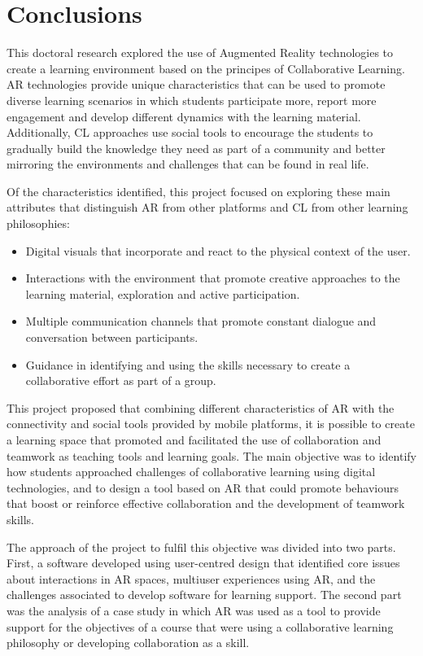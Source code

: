 \chapter{Conclusions \label{ch7}}

This doctoral research explored the use of Augmented Reality technologies to create a learning environment based on the principes of Collaborative Learning. \acf{AR}
technologies provide unique characteristics that can be used to promote diverse learning scenarios in which students participate more, report more engagement and develop
different dynamics with the learning material. Additionally, \acf{CL} approaches use social tools to encourage the students to gradually build the knowledge they need as
part of a community and better mirroring the environments and challenges that can be found in real life.

Of the characteristics identified, this project focused on exploring these main attributes that distinguish \ac{AR} from other platforms and \ac{CL} from other learning
philosophies:

\begin{itemize}
    \item Digital visuals that incorporate and react to the physical context of the user.
    \item Interactions with the environment that promote creative approaches to the learning material, exploration and active participation.
    \item Multiple communication channels that promote constant dialogue and conversation between participants.
    \item Guidance in identifying and using the skills necessary to create a collaborative effort as part of a group.
\end{itemize}

This project proposed that combining different characteristics of \ac{AR} with the connectivity and social tools provided by mobile platforms, it is possible to create a
learning space that promoted and facilitated the use of collaboration and teamwork as teaching tools and learning goals. The main objective was to identify how students
approached challenges of collaborative learning using digital technologies, and to design a tool based on \ac{AR} that could promote behaviours that boost or reinforce
effective collaboration and the development of teamwork skills.

The approach of the project to fulfil this objective was divided into two parts. First, a software developed using user-centred design that identified core issues about
interactions in \ac{AR} spaces, multiuser experiences using \ac{AR}, and the challenges associated to develop software for learning support. The second part was the
analysis of a case study in which \ac{AR} was used as a tool to provide support for the objectives of a course that were using a collaborative learning philosophy or
developing collaboration as a skill.

